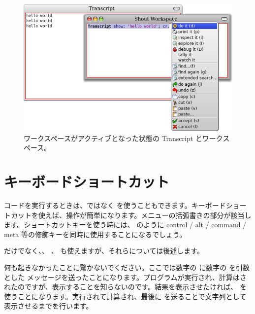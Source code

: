 \documentclass[a4paper,10pt,twoside]{book}
\begin{document}
\begin{figure}[htb]
\centerline {\includegraphics[width=\textwidth]{HelloWorld}}
\caption{ワークスペースがアクティブとなった状態の Transcript とワークスペース。}
\end{figure}

\section{キーボードショートカット}

コードを実行するときは、\actclick ではなく を使うこともできます。キーボードショートカットを使えば、操作が簡単になります。メニューの括弧書きの部分が該当します。ショートカットキーを使う時には、 のように control / alt / command / meta 等の修飾キーを同時に使用することになるでしょう。


 だけでなく、、 、  も使えますが、それらについては後述します。


何も起きなかったことに驚かないでください。ここでは数字の  に数字の  を引数とした \ct{+} メッセージを送ったことになります。プログラムが実行され、計算はされたのですが、表示することを知らないのです。結果を表示させたければ、 を使うことになります。実行されて計算され、最後に  を送ることで文字列として表示させるまでを行います。
\end{document}
